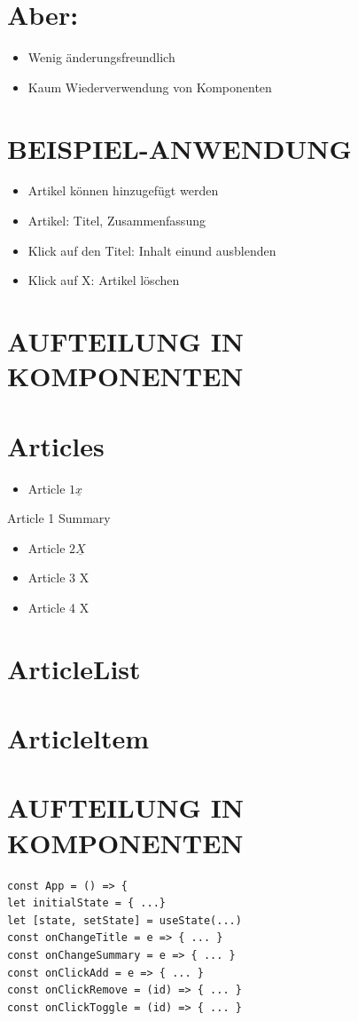 \documentclass[10pt]{article}
\begin{document}
\section*{Aber:}
\begin{itemize}
  \item Wenig änderungsfreundlich
  \item Kaum Wiederverwendung von Komponenten
\end{itemize}

\section*{BEISPIEL-ANWENDUNG}


\begin{itemize}
  \item Artikel können hinzugefügt werden
  \item Artikel: Titel, Zusammenfassung
  \item Klick auf den Titel: Inhalt einund ausblenden
  \item Klick auf X: Artikel löschen
\end{itemize}

\section*{AUFTEILUNG IN KOMPONENTEN}
\section*{Articles}
\begin{itemize}
  \item Article $1 \underline{x}$
\end{itemize}

Article 1 Summary

\begin{itemize}
  \item Article $2 \underline{X}$
  \item Article 3 X
  \item Article 4 X
\end{itemize}

\section*{ArticleList}
\section*{Articleltem}
\section*{AUFTEILUNG IN KOMPONENTEN}
\begin{verbatim}
const App = () => {
let initialState = { ...}
let [state, setState] = useState(...)
const onChangeTitle = e => { ... }
const onChangeSummary = e => { ... }
const onClickAdd = e => { ... }
const onClickRemove = (id) => { ... }
const onClickToggle = (id) => { ... }
\end{verbatim}
\end{document}
